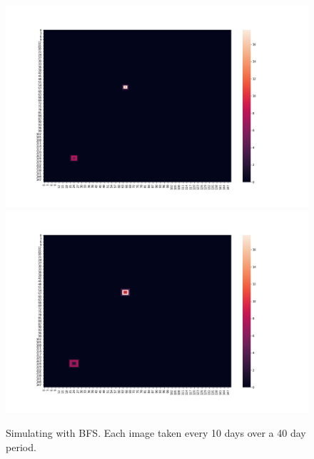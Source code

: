 \documentclass[a4paper]{article}
\begin{document}
\begin{figure}[ht]
  \centering
  \includegraphics[scale=0.15]{../no_quarantine/no_quarantine_heatmap_2.png}
  \centering
  \includegraphics[scale=0.15]{../no_quarantine/no_quarantine_heatmap_3.png}
  \centering
  \caption{Simulating with BFS. Each image taken every 10 days over a
  40 day period.}
\end{figure}
\end{document}
